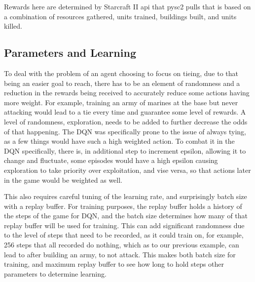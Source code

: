 Rewards here are determined by Starcraft II api that pysc2 pulls that is based on a combination of resources gathered, units trained, buildings built, and units killed. \cite{vinyals2017starcraft}


\subsection{Parameters and Learning}
To deal with the problem of an agent choosing to focus on tieing, due to that being an easier goal to reach, there has to be an element of randomness and a reduction in the rewards being received to accurately reduce some actions having more weight. For example,
training an army of marines at the base but never attacking would lead to a tie every time and guarantee some level of rewards. A level of randomness, exploration, needs to be added to further decrease the odds of that happening. The DQN was specifically prone to
the issue of always tying, as a few things would have such a high weighted action. To combat it in the DQN specifically, there is, in additional step to increment epsilon, allowing it to change and fluctuate, some episodes would have a high epsilon causing 
exploration to take priority over exploitation, and vise versa, so that actions later in the game would be weighted as well. 

This also requires careful tuning of the learning rate, and surprisingly batch size with a replay buffer. For training purposes, the replay buffer holds a history of the steps of the game for DQN, and the batch size determines how many of that replay buffer will
be used for training. This can add significant randomness due to the level of steps that need to be recorded, as it could train on, for example, 256 steps that all recorded do nothing, which as to our previous example, can lead to after building an army, to not 
attack. This makes both batch size for training, and maximum replay buffer to see how long to hold steps other parameters to determine learning. 
